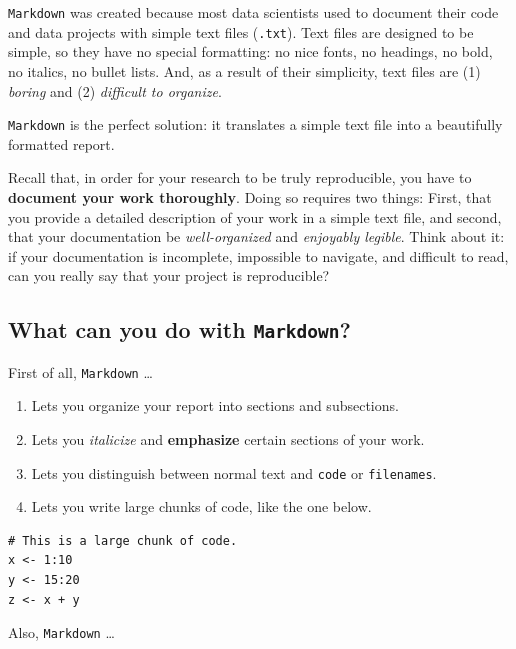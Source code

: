 \documentclass[
]{book}
\providecommand{\tightlist}{%
  \setlength{\itemsep}{0pt}\setlength{\parskip}{0pt}}
\begin{document}
\texttt{Markdown} was created because most data scientists used to document their
code and data projects with simple text files (\texttt{.txt}). Text files are designed
to be simple, so they have no special formatting: no nice fonts, no headings,
no bold, no italics, no bullet lists. And, as a result of their simplicity,
text files are (1) \emph{boring} and (2) \emph{difficult to organize}.

\texttt{Markdown} is the perfect solution: it translates a simple text file into a
beautifully formatted report.

Recall that, in order for your research to be truly reproducible, you have to
\textbf{document your work thoroughly}. Doing so requires two things: First, that
you provide a detailed description of your work in a simple text file, and
second, that your documentation be \emph{well-organized} and \emph{enjoyably legible}.
Think about it: if your documentation is incomplete, impossible to navigate,
and difficult to read, can you really say that your project is reproducible?

\hypertarget{what-can-you-do-with-markdown}{%
\subsection*{\texorpdfstring{What can you do with \texttt{Markdown}?}{What can you do with Markdown?}}\label{what-can-you-do-with-markdown}}

First of all, \texttt{Markdown} \ldots{}

\begin{enumerate}
\def\labelenumi{\arabic{enumi}.}
\tightlist
\item
  Lets you organize your report into sections and subsections.\\
\item
  Lets you \emph{italicize} and \textbf{emphasize} certain sections of your work.
\item
  Lets you distinguish between normal text and \texttt{code} or \texttt{filenames}.
\item
  Lets you write large chunks of code, like the one below.
\end{enumerate}

\begin{verbatim}
# This is a large chunk of code. 
x <- 1:10
y <- 15:20
z <- x + y
\end{verbatim}

Also, \texttt{Markdown} \ldots{}
\end{document}
